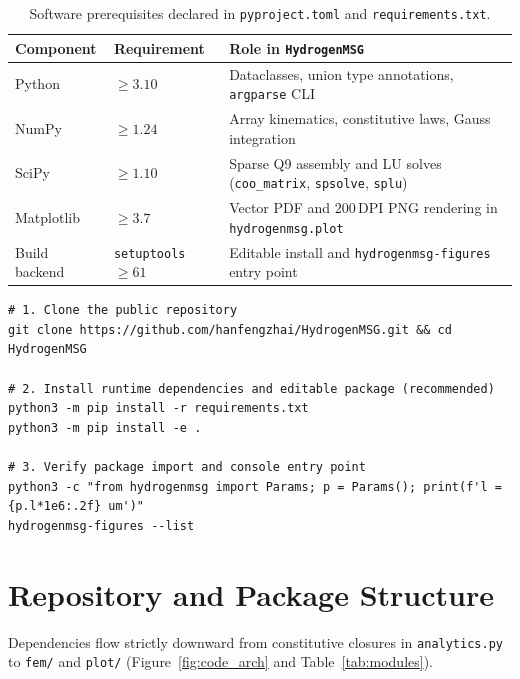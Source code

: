 \documentclass[11pt]{article}
\begin{document}
\begin{table}[!htbp]
\centering
\caption{Software prerequisites declared in \texttt{pyproject.toml} and \texttt{requirements.txt}.}
\label{tab:prereqs}
\small
\setlength{\tabcolsep}{6pt}
\begin{tabularx}{\textwidth}{@{}>{\raggedright\arraybackslash}l >{\raggedright\arraybackslash}l >{\raggedright\arraybackslash}X@{}}
\toprule
Component & Requirement & Role in \texttt{HydrogenMSG} \\
\midrule
Python & $\ge 3.10$ & Dataclasses, union type annotations, \texttt{argparse} CLI \\
NumPy & $\ge 1.24$ & Array kinematics, constitutive laws, Gauss integration \\
SciPy & $\ge 1.10$ & Sparse Q9 assembly and LU solves (\texttt{coo\_matrix}, \texttt{spsolve}, \texttt{splu}) \\
Matplotlib & $\ge 3.7$ & Vector PDF and $200$\,DPI PNG rendering in \texttt{hydrogenmsg.plot} \\
Build backend & \texttt{setuptools} $\ge 61$ & Editable install and \texttt{hydrogenmsg-figures} entry point \\
\bottomrule
\end{tabularx}
\end{table}

\noindent\begin{minipage}{\textwidth}
\begin{lstlisting}[style=runshell]
# 1. Clone the public repository
git clone https://github.com/hanfengzhai/HydrogenMSG.git && cd HydrogenMSG

# 2. Install runtime dependencies and editable package (recommended)
python3 -m pip install -r requirements.txt
python3 -m pip install -e .

# 3. Verify package import and console entry point
python3 -c "from hydrogenmsg import Params; p = Params(); print(f'l = {p.l*1e6:.2f} um')"
hydrogenmsg-figures --list
\end{lstlisting}
\end{minipage}

\section{Repository and Package Structure}

Dependencies flow strictly downward from constitutive closures in \texttt{analytics.py} to \texttt{fem/} and \texttt{plot/} (Figure~\ref{fig:code_arch} and Table~\ref{tab:modules}).
\end{document}
